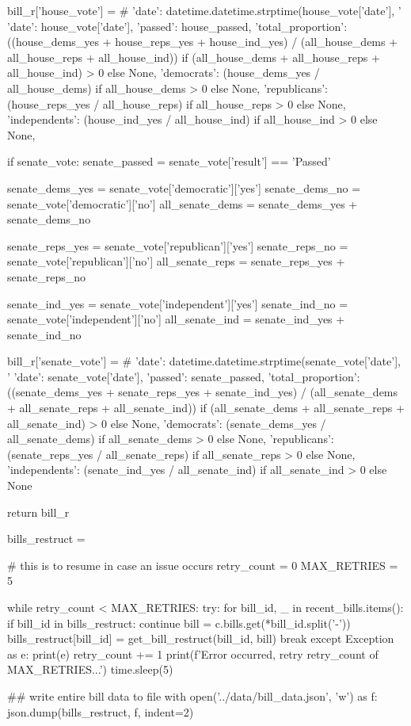 \begin{pyin}
        bill_r['house_vote'] = {
            # 'date': datetime.datetime.strptime(house_vote['date'], '%
            'date': house_vote['date'],
            'passed': house_passed,
            'total_proportion': ((house_dems_yes + house_reps_yes + house_ind_yes) / (all_house_dems + all_house_reps + all_house_ind)) if (all_house_dems + all_house_reps + all_house_ind) > 0 else None,
            'democrats': (house_dems_yes / all_house_dems) if all_house_dems > 0 else None,
            'republicans': (house_reps_yes / all_house_reps) if all_house_reps > 0 else None,
            'independents': (house_ind_yes / all_house_ind) if all_house_ind > 0 else None,
        }

    if senate_vote:
        senate_passed = senate_vote['result'] == 'Passed'

        senate_dems_yes = senate_vote['democratic']['yes']
        senate_dems_no = senate_vote['democratic']['no']
        all_senate_dems = senate_dems_yes + senate_dems_no

        senate_reps_yes = senate_vote['republican']['yes']
        senate_reps_no = senate_vote['republican']['no']
        all_senate_reps = senate_reps_yes + senate_reps_no

        senate_ind_yes = senate_vote['independent']['yes']
        senate_ind_no = senate_vote['independent']['no']
        all_senate_ind = senate_ind_yes + senate_ind_no

        bill_r['senate_vote'] = {
            # 'date': datetime.datetime.strptime(senate_vote['date'], '%
            'date': senate_vote['date'],
            'passed': senate_passed,
            'total_proportion': ((senate_dems_yes + senate_reps_yes + senate_ind_yes) / (all_senate_dems + all_senate_reps + all_senate_ind)) if (all_senate_dems + all_senate_reps + all_senate_ind) > 0 else None,
            'democrats': (senate_dems_yes / all_senate_dems) if all_senate_dems > 0 else None,
            'republicans': (senate_reps_yes / all_senate_reps) if all_senate_reps > 0 else None,
            'independents': (senate_ind_yes / all_senate_ind) if all_senate_ind > 0 else None
        }

    return bill_r
\end{pyin}

\begin{pyin}
bills_restruct = {}

# this is to resume in case an issue occurs
retry_count = 0
MAX_RETRIES = 5

while retry_count < MAX_RETRIES:
    try:
        for bill_id, _ in recent_bills.items():
            if bill_id in bills_restruct:
                continue
            bill = c.bills.get(*bill_id.split('-'))
            bills_restruct[bill_id] = get_bill_restruct(bill_id, bill)
        break
    except Exception as e:
        print(e)
        retry_count += 1
        print(f'Error occurred, retry {retry_count} of {MAX_RETRIES}...')
        time.sleep(5)
\end{pyin}

\begin{pyin}
\## write entire bill data to file
with open('../data/bill_data.json', 'w') as f:
    json.dump(bills_restruct, f, indent=2)
\end{pyin}
